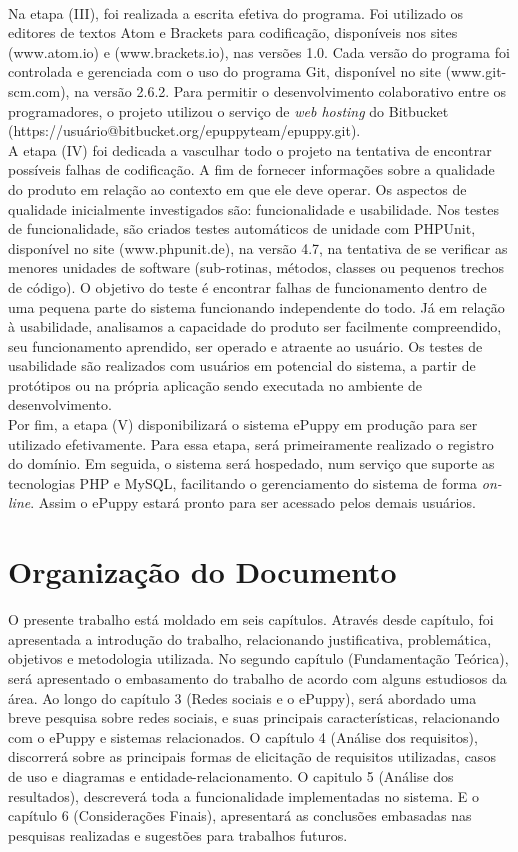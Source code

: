 \\
\indent
Na etapa (III), foi realizada a escrita efetiva do programa. Foi utilizado os editores de textos Atom e Brackets para codificação, disponíveis nos sites (www.atom.io) e (www.brackets.io), nas versões 1.0. Cada versão do programa foi controlada e gerenciada com o uso do programa Git, disponível no site (www.git-scm.com), na versão 2.6.2. Para permitir o desenvolvimento colaborativo entre os programadores, o projeto utilizou o serviço de {\it web hosting} do Bitbucket (https://usuário@bitbucket.org/epuppyteam/epuppy.git).
\\
\indent
A etapa (IV) foi dedicada a vasculhar todo o projeto na tentativa de encontrar possíveis falhas de codificação. A fim de fornecer informações sobre a qualidade do produto em relação ao contexto em que ele deve operar. Os aspectos de qualidade inicialmente investigados são: funcionalidade e usabilidade. Nos testes de funcionalidade, são criados testes automáticos de unidade com PHPUnit, disponível no site (www.phpunit.de), na versão 4.7, na tentativa de se verificar as menores unidades de software (sub-rotinas, métodos, classes ou pequenos trechos de código). O objetivo do teste é encontrar falhas de funcionamento dentro de uma pequena parte do sistema funcionando independente do todo. Já em relação à usabilidade, analisamos a capacidade do produto ser facilmente compreendido, seu funcionamento aprendido, ser operado e atraente ao usuário. Os testes de usabilidade são realizados com usuários em potencial do sistema, a partir de protótipos ou na própria aplicação sendo executada no ambiente de desenvolvimento.
\\
\indent
Por fim, a etapa (V) disponibilizará o sistema ePuppy em produção para ser utilizado efetivamente. Para essa etapa, será primeiramente realizado o registro do domínio. Em seguida, o sistema será hospedado, num serviço que suporte as tecnologias PHP e MySQL, facilitando o gerenciamento do sistema de forma {\it on-line}. Assim o ePuppy estará pronto para ser acessado pelos demais usuários.


\section{Organização do Documento}

O presente trabalho está moldado em seis capítulos. Através desde capítulo, foi apresentada a introdução do trabalho, relacionando justificativa, problemática, objetivos e metodologia utilizada. No segundo capítulo (Fundamentação Teórica), será apresentado o embasamento do trabalho de acordo com alguns estudiosos da área. Ao longo do capítulo 3 (Redes sociais e o ePuppy), será abordado uma breve pesquisa sobre redes sociais, e suas principais características, relacionando com o ePuppy e sistemas relacionados. O capítulo 4 (Análise dos requisitos), discorrerá sobre as principais formas de elicitação de requisitos utilizadas, casos de uso e diagramas e entidade-relacionamento. O capitulo 5 (Análise dos resultados), descreverá toda a funcionalidade implementadas no sistema. E o capítulo 6 (Considerações Finais), apresentará as conclusões embasadas nas pesquisas realizadas e sugestões para trabalhos futuros.
